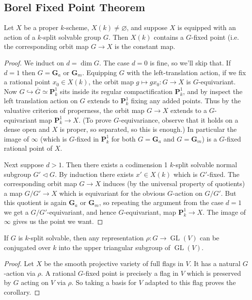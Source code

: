 \documentclass[10pt]{article}
\renewcommand{\(}{\left(}
\renewcommand{\)}{\right)}
\numberwithin{thm}{subsection}
\begin{document}
\subsection{Borel Fixed Point Theorem}
\begin{thm}\label{borelfixedpoint}
Let $X$ be a proper $k$-scheme, $X(k)\neq\varnothing$,
and suppose $X$ is equipped with an action
of a $k$-split solvable group $G$.
Then $X(k)$ contains a $G$-fixed point (i.e.
the corresponding orbit map $G\rightarrow X$ is the constant map.
\end{thm}
\begin{proof}
We induct on $d=\dim G$.
The case $d=0$ is fine, so we'll skip that.
If $d=1$ then $G=\mathbf{G}_a$ or $\mathbf{G}_m$.
Equipping $G$ with the left-translation action,
if we fix a rational point $x_0\in X(k)$,
the orbit map $g\mapsto gx_0:G\rightarrow X$
is $G$-equivariant.
Now $G\hookrightarrow \overline{G}\simeq \mathbf{P}^1_k$
sits inside its regular compactification $\mathbf{P}^1_k$,
and by inspect the left translation action on $G$
extends to $\mathbf{P}^1_k$ fixing any added points.
Thus by the valuative criterion of properness,
the orbit map $G\rightarrow X$
extends to a $G$-equivariant map
$\mathbf{P}^1_k\rightarrow X$.
(To prove $G$-equivariance, observe that it holds on a dense open
and $X$ is proper, so separated, so this is enough.)
In particular the image of $\infty$ (which is $G$-fixed in $\mathbf{P}^1_k$
for both $G=\mathbf{G}_a$ and $G=\mathbf{G}_m$) is a $G$-fixed rational point of $X$. 

Next suppose $d>1$.
Then there exists a codimension 1
$k$-split solvable normal subgroup $G'\vartriangleleft G$.
By induction there exists $x'\in X(k)$ which is $G'$-fixed.
The corresponding orbit map $G\rightarrow X$
induces (by the universal property of quotients)
a map $G/G'\rightarrow X$ which is equivariant for the obvious $G$-action
on $G/G'$. But this quotient is again $\mathbf{G}_a$ or $\mathbf{G}_m$,
so repeating the argument from the case $d=1$
we get a $G/G'$-equivariant, and hence $G$-equivariant,
 map $\mathbf{P}^1_k\rightarrow X$. The image of $\infty$ gives us the point we want.
\end{proof}
\begin{cor}\label{Lie-Kolchin}
If $G$ is $k$-split solvable, then any representation $\rho:G\rightarrow\operatorname{GL}(V)$ can be conjugated over $k$ into the upper triangular subgroup of $\operatorname{GL}(V)$.
\end{cor}
\begin{proof}
Let $X$ be the smooth projective variety of full flags in $V$.
It has a natural $G$-action via $\rho$.
A rational $G$-fixed point is precisely a flag in $V$
which is preserved by $G$ acting on $V$ via $\rho$.
So taking a basis for $V$ adapted to this flag proves the corollary. 
\end{proof}
\end{document}

